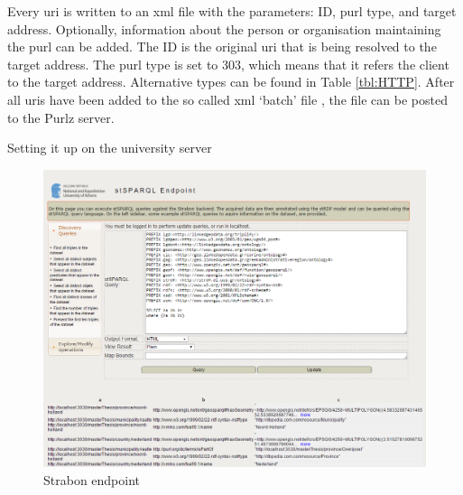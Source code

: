 Every \ac{uri} is written to an \ac{xml} file with the parameters: ID, \ac{purl} type, and target address. Optionally, information about the person or organisation maintaining the \ac{purl} can be added. The ID is the original \ac{uri} that is being resolved to the target address. The \ac{purl} type is set to 303, which means that it refers the client to the target address. Alternative types can be found in Table \ref{tbl:HTTP}. After all \acp{uri} have been added to the so called \ac{xml} `batch' file \citep{LD:PURL2}, the file can be posted to the Purlz server. \\

\begin{table}[]
	\centering
	\caption{Types of PURLs \citep{LD:PURL}}
	\label{tbl:HTTP}
\end{table}

Setting it up on the university server

\begin{figure}
	\centering
	\includegraphics[width=\linewidth]{figs/Strabon.PNG}
	\caption{Strabon endpoint}
	\label{fig:Strabon}
\end{figure}

